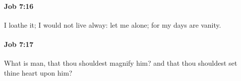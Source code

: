 		\paragraph{Job 7:16} %
			\label{JOB-7-16}

			I loathe it; I would not live alway: let me alone; for my days are vanity.


		\paragraph{Job 7:17} %
			\label{JOB-7-17}

			What is man, that thou shouldest magnify him? and that thou shouldest set thine heart upon him?


